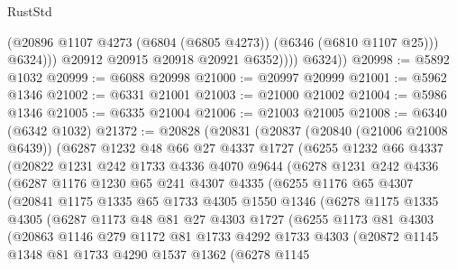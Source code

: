 \begin{lexlean}{RustStd}
\begin{coremodule}
                      (@20896 @1107 @4273 (@6804 (@6805 @4273)) (@6346 (@6810 @1107 @25)))
                      @6324)))
                @20912
                @20915
                @20918
                @20921
                @6352))))
        @6324))
@20998 := @5892 @1032
@20999 := @6088 @20998
@21000 := @20997 @20999
@21001 := @5962 @1346
@21002 := @6331 @21001
@21003 := @21000 @21002
@21004 := @5986 @1346
@21005 := @6335 @21004
@21006 := @21003 @21005
@21008 := @6340 (@6342 @1032)
@21372 := @20828
    (@20831
      (@20837
        (@20840 (@21006 @21008 @6439))
        (@6287
          @1232
          @48
          @66
          @27
          @4337
          @1727
          (@6255
            @1232
            @66
            @4337
            (@20822
              @1231
              @242
              @1733
              @4336
              @4070
              @9644
              (@6278
                @1231
                @242
                @4336
                (@6287
                  @1176
                  @1230
                  @65
                  @241
                  @4307
                  @4335
                  (@6255
                    @1176
                    @65
                    @4307
                    (@20841
                      @1175
                      @1335
                      @65
                      @1733
                      @4305
                      @1550
                      @1346
                      (@6278
                        @1175
                        @1335
                        @4305
                        (@6287
                          @1173
                          @48
                          @81
                          @27
                          @4303
                          @1727
                          (@6255
                            @1173
                            @81
                            @4303
                            (@20863
                              @1146
                              @279
                              @1172
                              @81
                              @1733
                              @4292
                              @1733
                              @4303
                              (@20872
                                @1145
                                @1348
                                @81
                                @1733
                                @4290
                                @1537
                                @1362
                                (@6278
                                  @1145

\end{coremodule}
\end{lexlean}
